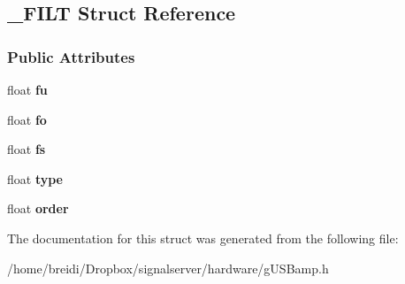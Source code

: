 \hypertarget{struct___f_i_l_t}{
\subsection{\_\-FILT Struct Reference}
\label{struct___f_i_l_t}
}
\subsubsection*{Public Attributes}
\begin{DoxyCompactItemize}
\item 
\hypertarget{struct___f_i_l_t_a240ddbab89a658c2b272971692060130}{
float {\bfseries fu}}
\label{struct___f_i_l_t_a240ddbab89a658c2b272971692060130}

\item 
\hypertarget{struct___f_i_l_t_a4d8835fa4886de973da3aa392a25792a}{
float {\bfseries fo}}
\label{struct___f_i_l_t_a4d8835fa4886de973da3aa392a25792a}

\item 
\hypertarget{struct___f_i_l_t_abab2747d12df763ecfd5ef64bdd5c504}{
float {\bfseries fs}}
\label{struct___f_i_l_t_abab2747d12df763ecfd5ef64bdd5c504}

\item 
\hypertarget{struct___f_i_l_t_a2b9aa556b84b1b3ab7bcb954cf052a90}{
float {\bfseries type}}
\label{struct___f_i_l_t_a2b9aa556b84b1b3ab7bcb954cf052a90}

\item 
\hypertarget{struct___f_i_l_t_a7aadbc86e36257ef2f8485a00843306a}{
float {\bfseries order}}
\label{struct___f_i_l_t_a7aadbc86e36257ef2f8485a00843306a}

\end{DoxyCompactItemize}


The documentation for this struct was generated from the following file:\begin{DoxyCompactItemize}
\item 
/home/breidi/Dropbox/signalserver/hardware/gUSBamp.h\end{DoxyCompactItemize}

